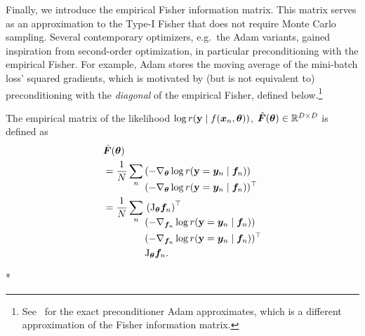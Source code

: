 Finally, we introduce the empirical Fisher information matrix. This matrix serves
as an approximation to the Type-I Fisher that does not require Monte Carlo sampling.
Several contemporary optimizers, e.g.~the Adam variants, gained inspiration from
second-order optimization, in particular preconditioning with the empirical Fisher.
For example, Adam stores the moving average of the mini-batch loss' squared gradients,
which is motivated by (but is not equivalent to) preconditioning with the \emph{diagonal}
of the empirical Fisher, defined below.\footnote{See~\cite{pmlr-v235-lin24e} for the exact
preconditioner Adam approximates, which is a different approximation of the Fisher
information matrix.}

\begin{definition}\label{def:emp_fisher}%
  The empirical matrix of the likelihood $\log r({\mathbf{y}} \mid f({\bm{x}}_n, {\bm{\theta}}))$,
  $\hat{{\bm{F}}}({\bm{\theta}}) \in {\mathbb{R}}^{D \times D}$ is defined as
  \begin{align*}
    & \hat{{\bm{F}}}({\bm{\theta}}) \\
	& = \frac{1}{N} \sum_{n}
	\begin{aligned}[t]
	   & (-\nabla_{{\bm{\theta}}} \log r({\mathbf{y}} = {\bm{y}}_n \mid {\bm{f}}_n))        \\
	   & (-\nabla_{{\bm{\theta}}} \log r({\mathbf{y}} = {\bm{y}}_n \mid {\bm{f}}_n))^{\top} \\
	\end{aligned} \\
    & = \frac{1}{N} \sum_{n}
    \begin{aligned}[t]
       & \left(\mathrm{J}_{{\bm{\theta}}}{\bm{f}}_n\right)^{\top}                  \\
       & (-\nabla_{{\bm{f}}_n} \log r({\mathbf{y}} = {\bm{y}}_n \mid {\bm{f}}_n))        \\
       & (-\nabla_{{\bm{f}}_n} \log r({\mathbf{y}} = {\bm{y}}_n \mid {\bm{f}}_n))^{\top} \\
       & \mathrm{J}_{{\bm{\theta}}}{\bm{f}}_n.
    \end{aligned}
  \end{align*}
\end{definition}

\switchcolumn[1]*
\switchcolumn[0]

